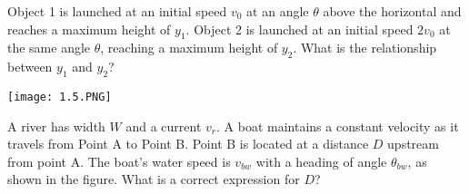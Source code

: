 \documentclass[../mech.tex]{subfiles}
\begin{document}
\ex Object 1 is launched at an initial speed $v_0$ at an angle $\theta$ above the horizontal and reaches a maximum height of $y_1$. Object 2 is launched at an initial speed $2v_0$ at the same angle $\theta$, reaching a maximum height of $y_2$. What is the relationship between $y_1$ and $y_2$?

\ex \begin{center}
    \texttt{[image: 1.5.PNG]}
\end{center}
A river has width $W$ and a current $v_r$. A boat maintains a constant velocity as it travels from Point A to Point B. Point B is located at a distance $D$ upstream from point A. The boat's water speed is 
$v_{bw}$ with a heading of angle $\theta_{bw}$, as shown in the figure. What is a correct expression for $D$?
\end{document}
